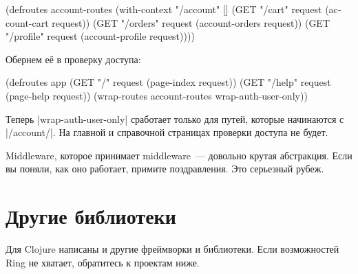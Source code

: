 \begin{english}
  \begin{clojure}
(defroutes account-routes
  (with-context "/account" []
    (GET "/cart" request (account-cart request))
    (GET "/orders" request (account-orders request))
    (GET "/profile" request (account-profile request))))
  \end{clojure}
\end{english}

\noindent
Обернем е\"{е} в проверку доступа:

\begin{english}
  \begin{clojure}
(defroutes app
  (GET "/" request (page-index request))
  (GET "/help" request (page-help request))
  (wrap-routes account-routes wrap-auth-user-only))
  \end{clojure}
\end{english}

Теперь \spverb|wrap-auth-user-only| сработает только для путей, которые
начинаются с \spverb|/account/|. На главной и справочной страницах проверки
доступа не будет.

Middleware, которое принимает middleware~--- довольно крутая абстракция. Если вы
поняли, как оно работает, примите поздравления. Это серьезный рубеж.

\section{Другие библиотеки}

Для Clojure написаны и другие фреймворки и библиотеки. Если возможностей Ring не
хватает, обратитесь к проектам ниже.

